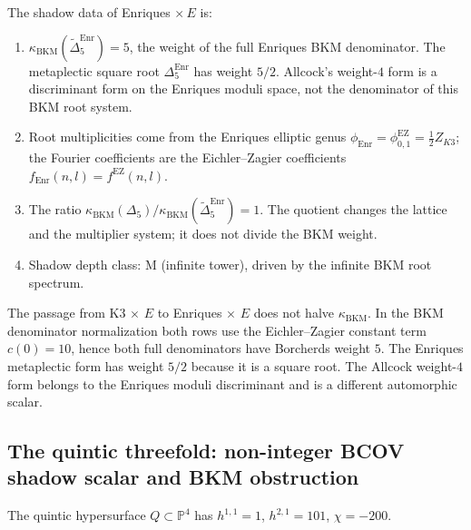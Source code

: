 \begin{theorem}
\label{thm:enriques-shadow}
The shadow data of Enriques $\times\, E$ is:
\begin{enumerate}[label=(\roman*)]
 \item $\kappa_{\mathrm{BKM}}(\widetilde\Delta^{\mathrm{Enr}}_5)=5$, the weight of the full Enriques BKM denominator. The metaplectic square root $\Delta^{\mathrm{Enr}}_5$ has weight $5/2$. Allcock's weight-$4$ form is a discriminant form on the Enriques moduli space, not the denominator of this BKM root system.
 \item Root multiplicities come from the Enriques elliptic genus $\phi_{\mathrm{Enr}}=\phi^{\mathrm{EZ}}_{0,1}=\tfrac12 Z_{K3}$; the Fourier coefficients are the Eichler--Zagier coefficients \(f_{\mathrm{Enr}}(n,l)=f^{\mathrm{EZ}}(n,l)\).
 \item The ratio $\kappa_{\mathrm{BKM}}(\Delta_5)/\kappa_{\mathrm{BKM}}(\widetilde\Delta^{\mathrm{Enr}}_5)=1$. The quotient changes the lattice and the multiplier system; it does not divide the BKM weight.
 \item Shadow depth class: M \textup{(}infinite tower\textup{)}, driven by the infinite BKM root spectrum.
\end{enumerate}
\end{theorem}

\begin{remark}
\label{rem:z2-quotient-kappa}
The passage from K3$\,\times\, E$ to Enriques$\,\times\, E$ does not halve
\(\kappa_{\mathrm{BKM}}\). In the BKM denominator normalization both rows
use the Eichler--Zagier constant term \(c(0)=10\), hence both full
denominators have Borcherds weight \(5\). The Enriques metaplectic form
has weight \(5/2\) because it is a square root. The Allcock weight-$4$
form belongs to the Enriques moduli discriminant and is a different
automorphic scalar.
\end{remark}


\subsection{The quintic threefold: non-integer BCOV shadow scalar and BKM obstruction}
\label{subsec:quintic}

The quintic hypersurface $Q \subset \mathbb{P}^4$ has $h^{1,1} = 1$, $h^{2,1} = 101$, $\chi = -200$.

